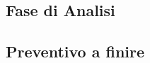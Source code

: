 \documentclass[../piano-di-progetto.tex]{subfiles}
\begin{document}
\subsection{Fase di Analisi}%
\label{sub:fase_di_analisi}

\subsection{Preventivo a finire}%
\label{sub:preventivo_a_finire}

\end{document}
